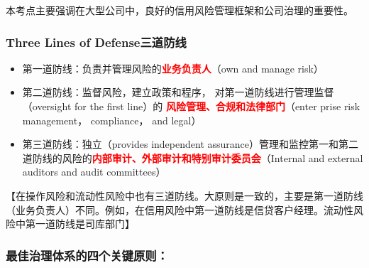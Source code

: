 本考点主要强调在大型公司中，良好的信用风险管理框架和公司治理的重要性。


\subsubsection{Three Lines of Defense三道防线}

\begin{itemize}

    \item  第一道防线：负责并管理风险的\textbf{\textcolor{red} {业务负责人}}（own and manage risk）
    \item  第二道防线：监督风险，建立政策和程序， 对第一道防线进行管理监督（oversight for the first line）的 \textbf{\textcolor{red} {风险管理、合规和法律部门}}（enter prise risk
    management， compliance， and legal）
    
    \item  第三道防线：独立（provides independent assurance）管理和监控第一和第二道防线的风险的\textbf{\textcolor{red} {内部审计、外部审计和特别审计委员会}}（Internal and external auditors and audit committees）
\end{itemize}

【在操作风险和流动性风险中也有三道防线。大原则是一致的，主要是第一道防线（业务负责人）不同。例如，在信用风险中第一道防线是信贷客户经理。流动性风险中第一道防线是司库部门】
    
 

\subsubsection{最佳治理体系的四个关键原则：}

